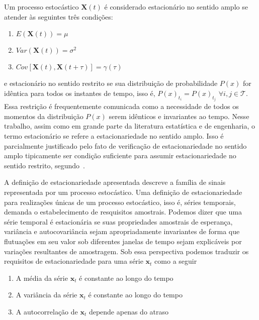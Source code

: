Um processo estocástico $\mathbf{X}(t)$ é considerado estacionário no
sentido amplo se atender às seguintes três condições:

\begin{enumerate}
    \item $E(\mathbf{X}(t)) = \mu$
    \item $Var(\mathbf{X}(t)) = \sigma^2$
    \item $Cov[\mathbf{X}(t), \mathbf{X}(t+\tau)] = \gamma(\tau)$
\end{enumerate}\vspace{.5cm}

e estacionário no sentido restrito se sua distribuição de probabilidade $P(x)$
for idêntica para todos os instantes de tempo, isso é, $P(x)_{t_{i}} = P(x)_{t_{j}}$
$\forall i, j \in \mathcal{T}$. Essa restrição é frequentemente comunicada como
a necessidade de todos os momentos da distribuição $P(x)$ serem idênticos e
invariantes ao tempo. Nesse trabalho, assim como em grande parte da literatura
estatística e de engenharia, o termo estacionário se refere a estacionariedade
no sentido amplo. Isso é parcialmente justificado pelo fato de verificação
de estacionariedade no sentido amplo tipicamente ser condição suficiente para
assumir estacionariedade no sentido restrito, segundo~\cite{random_data}.

A definição de estacionariedade apresentada descreve a família de sinais
representada por um processo estocástico. Uma definição de estacionariedade
para realizações únicas de um processo estocástico, isso é, séries temporais,
demanda o estabelecimento de resquisitos amostrais. Podemos dizer que uma
série temporal é estacionária se suas propriedades amostrais de esperança,
variância e autocovariância sejam apropriadamente invariantes de forma que
flutuações em seu valor sob diferentes janelas de tempo sejam explicáveis por
variações resultantes de amostragem. Sob essa perspectiva podemos traduzir
os requisitos de estacionariedade para uma série $\mathbf{x}_t$ como a seguir

\begin{enumerate}
    \item A média da série $\mathbf{x}_t$ é constante ao longo do tempo
    \item A variância da série $\mathbf{x}_t$ é constante ao longo do tempo
    \item A autocorrelação de $\mathbf{x}_t$ depende apenas do atraso
\end{enumerate}\vspace{.5cm}

